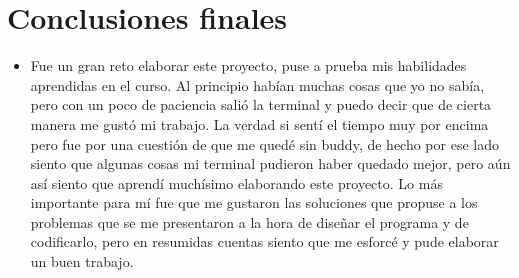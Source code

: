 \documentclass[letter,11pt]{article}
\begin{document}
\section{Conclusiones finales}
\begin{itemize}

    \item Fue un gran reto elaborar este proyecto, puse a prueba mis habilidades aprendidas en el curso. Al principio habían muchas cosas que yo no sabía, pero con un poco de paciencia salió la terminal y puedo decir que de cierta manera me gustó mi trabajo. La verdad si sentí el tiempo muy por encima pero fue por una cuestión de que me quedé sin buddy, de hecho por ese lado siento que algunas cosas mi terminal pudieron haber quedado mejor, pero aún así siento que aprendí muchísimo elaborando este proyecto. Lo más importante para mí fue que me gustaron las soluciones que propuse a los problemas que se me presentaron a la hora de diseñar el programa y de codificarlo, pero en resumidas cuentas siento que me esforcé y pude elaborar un buen trabajo.

    
\end{itemize}
\end{document}

